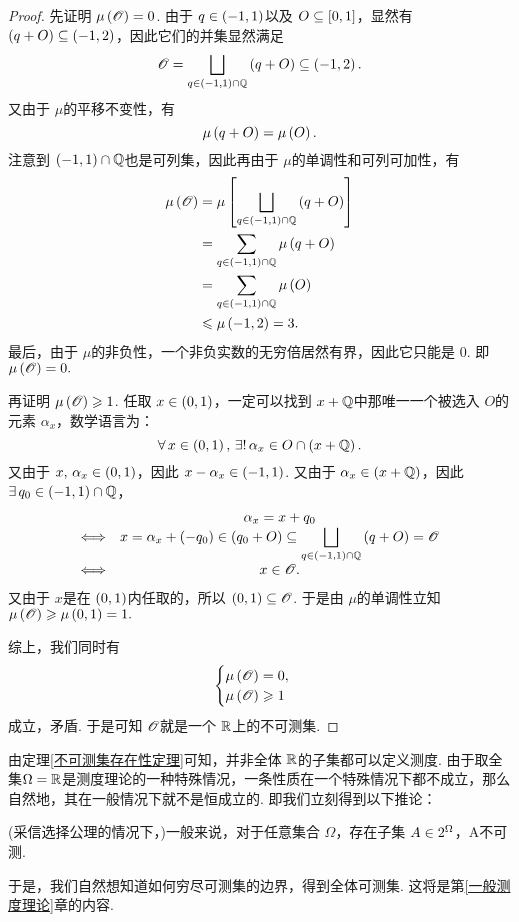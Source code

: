 \begin{proof}
    先证明 $\mu\left(\mathscr{O}\right)=0$. 由于 $q\in\left(-1,1\right)$以及 $O\subseteq\left[0,1\right]$，显然有 $\left(q+O\right)\subseteq\left(-1,2\right)$，因此它们的并集显然满足
    \[   \mathscr{O}= \bigsqcup_{q\in\left(-1,1\right)\cap\mathbb{Q}} \left(q+O\right) \subseteq\left(-1,2\right).   \]
    又由于 $\mu$的平移不变性，有
    \[   \mu\left(q+O\right)=\mu\left(O\right).   \]
    注意到 $\left(-1,1\right)\cap\mathbb{Q}$也是可列集，因此再由于 $\mu$的单调性和可列可加性，有
    \begin{align*}
        \mu\left(\mathscr{O}\right) &= \mu\left[ \bigsqcup_{q\in\left(-1,1\right)\cap\mathbb{Q}} \left(q+O\right) \right] \\
        &= \sum_{q\in\left(-1,1\right)\cap\mathbb{Q}} \mu\left(q+O\right) \\
        &= \sum_{q\in\left(-1,1\right)\cap\mathbb{Q}} \mu\left(O\right) \\
        &\leqslant \mu\left(-1,2\right) = 3.
    \end{align*}
    最后，由于 $\mu$的非负性，一个非负实数的无穷倍居然有界，因此它只能是 $0$. 即 $\mu\left(\mathscr{O}\right)=0.$
    \vspace{0.5cm}

    再证明 $\mu\left(\mathscr{O}\right)\geqslant 1$. 任取 $x\in\left(0,1\right)$，一定可以找到 $x+\mathbb{Q}$中那唯一一个被选入 $O$的元素 $\alpha_x$，数学语言为：
    \[    \forall\,x\in\left(0,1\right),\,\exists!\,\alpha_x\in O\cap\left(x+\mathbb{Q}\right).    \]
    又由于 $x,\,\alpha_x\in\left(0,1\right)$，因此 $x-\alpha_x\in\left(-1,1\right)$. 又由于 $\alpha_x\in\left(x+\mathbb{Q}\right)$，因此 $\exists\,q_0\in\left(-1,1\right)\cap\mathbb{Q}$，
    \[\begin{array}{lc}
         & \alpha_x = x+q_0 \\
       \Longleftrightarrow & \displaystyle  x = \alpha_x+\left(-q_0\right)\in \left(q_0+O\right) \subseteq \bigsqcup_{q\in\left(-1,1\right)\cap\mathbb{Q}} \left(q+O\right) = \mathscr{O} \\
       \Longleftrightarrow & x\in\mathscr{O}.
    \end{array} \]
    又由于 $x$是在 $\left(0,1\right)$内任取的，所以 $\left(0,1\right)\subseteq\mathscr{O}$. 于是由 $\mu$的单调性立知 $\mu\left(\mathscr{O}\right)\geqslant\mu\left(0,1\right)=1.$
    \vspace{0.5cm}

    综上，我们同时有
    \[\begin{cases}
        \mu\left(\mathscr{O}\right)=0, \\
        \mu\left(\mathscr{O}\right)\geqslant 1
    \end{cases}\]
    成立，矛盾. 于是可知 $\mathscr{O}$就是一个 $\mathbb{R}$上的不可测集.
\end{proof}
\vspace{0.5cm}

由定理\ref{不可测集存在性定理}可知，并非全体 $\mathbb{R}$的子集都可以定义测度. 由于取全集$\Omega=\mathbb{R}$是测度理论的一种特殊情况，一条性质在一个特殊情况下都不成立，那么自然地，其在一般情况下就不是恒成立的. 即我们立刻得到以下推论：
\begin{corollary}
    (采信选择公理的情况下，)一般来说，对于任意集合 $\Omega$，存在子集 $A\in2^{\Omega}$，A不可测.
\end{corollary}
于是，我们自然想知道如何穷尽可测集的边界，得到全体可测集. 这将是第\ref{一般测度理论}章的内容.

